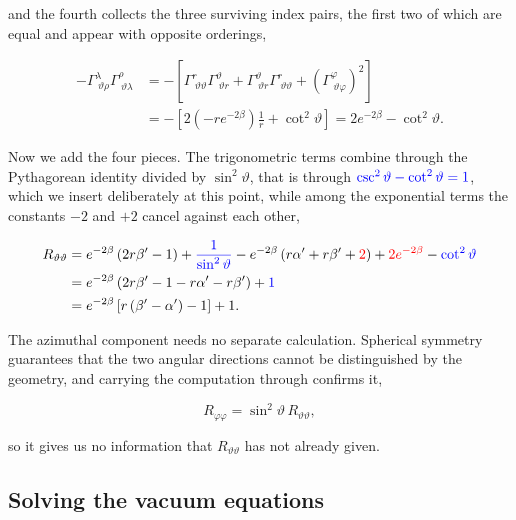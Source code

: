         and the fourth collects the three surviving index pairs, the first two of which are equal and appear with opposite orderings,

        \begin{align*}
            -\Gamma^{\lambda}_{\;\vartheta\rho}\Gamma^{\rho}_{\;\vartheta\lambda} &= -\left[\Gamma^{r}_{\;\vartheta\vartheta}\Gamma^{\vartheta}_{\;\vartheta r} + \Gamma^{\vartheta}_{\;\vartheta r}\Gamma^{r}_{\;\vartheta\vartheta} + \left(\Gamma^{\varphi}_{\;\vartheta\varphi}\right)^2\right]\\
            &= -\left[2\left(-re^{-2\beta}\right)\frac{1}{r} + \cot^2\vartheta\right] = 2e^{-2\beta} - \cot^2\vartheta.
        \end{align*}

        Now we add the four pieces. The trigonometric terms combine through the Pythagorean identity divided by $\sin^2\vartheta$, that is through ${\color{blue}\csc^2\vartheta - \cot^2\vartheta = 1}$, which we insert deliberately at this point, while among the exponential terms the constants $-2$ and $+2$ cancel against each other,

        \begin{align*}
            R_{\vartheta\vartheta} &= e^{-2\beta}\left(2r\beta' - 1\right) + {\color{blue}\frac{1}{\sin^2\vartheta}} - e^{-2\beta}\left(r\alpha'+r\beta'+{\color{red}2}\right) + {\color{red}2e^{-2\beta}} - {\color{blue}\cot^2\vartheta}\\
            &= e^{-2\beta}\left(2r\beta' - 1 - r\alpha' - r\beta'\right) + {\color{blue}1}\\
            &= e^{-2\beta}\left[r\left(\beta'-\alpha'\right) - 1\right] + 1.
        \end{align*}

        The azimuthal component needs no separate calculation. Spherical symmetry guarantees that the two angular directions cannot be distinguished by the geometry, and carrying the computation through confirms it,

        \begin{equation}
            R_{\varphi\varphi} = \sin^2\vartheta\, R_{\vartheta\vartheta},
        \end{equation}

        so it gives us no information that $R_{\vartheta\vartheta}$ has not already given.

    \subsection{Solving the vacuum equations}

